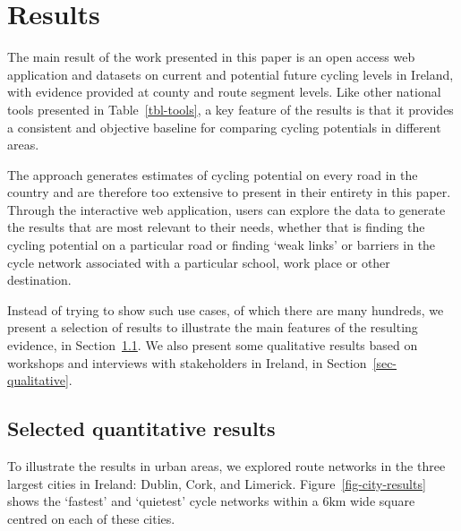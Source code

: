 \documentclass[
  super,
  preprint,
  3p]{elsarticle}
\begin{document}
\section{Results}\label{sec-results}

The main result of the work presented in this paper is an open access
web application and datasets on current and potential future cycling
levels in Ireland, with evidence provided at county and route segment
levels. Like other national tools presented in Table~\ref{tbl-tools}, a
key feature of the results is that it provides a consistent and
objective baseline for comparing cycling potentials in different areas.

The approach generates estimates of cycling potential on every road in
the country and are therefore too extensive to present in their entirety
in this paper. Through the interactive web application, users can
explore the data to generate the results that are most relevant to their
needs, whether that is finding the cycling potential on a particular
road or finding `weak links' or barriers in the cycle network associated
with a particular school, work place or other destination.

Instead of trying to show such use cases, of which there are many
hundreds, we present a selection of results to illustrate the main
features of the resulting evidence, in Section~\ref{sec-quantiative}. We
also present some qualitative results based on workshops and interviews
with stakeholders in Ireland, in Section~\ref{sec-qualitative}.

\subsection{Selected quantitative results}\label{sec-quantiative}

To illustrate the results in urban areas, we explored route networks in
the three largest cities in Ireland: Dublin, Cork, and Limerick.
Figure~\ref{fig-city-results} shows the `fastest' and `quietest' cycle
networks within a 6km wide square centred on each of these cities.
\end{document}
